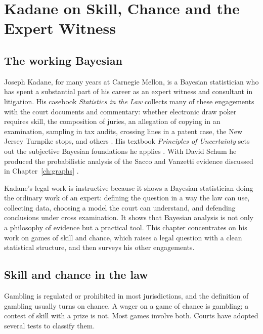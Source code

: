 \chapter{Kadane on Skill, Chance and the Expert Witness}
\label{ch:kadane}

\section{The working Bayesian}

Joseph Kadane, for many years at Carnegie Mellon, is a Bayesian statistician who has spent a substantial part of his career as an expert witness and consultant in litigation. His casebook \emph{Statistics in the Law} collects many of these engagements with the court documents and commentary: whether electronic draw poker requires skill, the composition of juries, an allegation of copying in an examination, sampling in tax audits, crossing lines in a patent case, the New Jersey Turnpike stops, and others \citep{kadane2008}. His textbook \emph{Principles of Uncertainty} sets out the subjective Bayesian foundations he applies \citep{kadane2011}. With David Schum he produced the probabilistic analysis of the Sacco and Vanzetti evidence discussed in Chapter~\ref{ch:graphs} \citep{kadane_schum1996}.

Kadane's legal work is instructive because it shows a Bayesian statistician doing the ordinary work of an expert: defining the question in a way the law can use, collecting data, choosing a model the court can understand, and defending conclusions under cross examination. It shows that Bayesian analysis is not only a philosophy of evidence but a practical tool. This chapter concentrates on his work on games of skill and chance, which raises a legal question with a clean statistical structure, and then surveys his other engagements.

\section{Skill and chance in the law}

Gambling is regulated or prohibited in most jurisdictions, and the definition of gambling usually turns on chance. A wager on a game of chance is gambling; a contest of skill with a prize is not. Most games involve both. Courts have adopted several tests to classify them.

